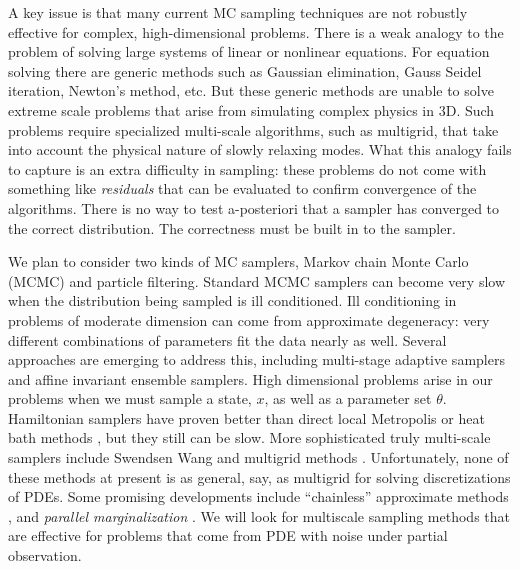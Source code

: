 \documentclass[11pt]{article}
\begin{document}
A key issue is that many current MC sampling techniques are not robustly effective for complex, 
high-dimensional problems. 
There is a weak analogy to the problem of solving large systems of linear or nonlinear equations.
For equation solving there are generic methods such as Gaussian elimination, Gauss Seidel iteration,
Newton's method, etc.
But these generic methods are unable to solve extreme scale problems that arise from simulating
complex physics in 3D.
Such problems require specialized multi-scale algorithms, such as multigrid, that take into account the
physical nature of slowly relaxing modes.
What this analogy fails to capture is an extra difficulty in sampling: these problems do not come with 
something like {\em residuals} that can be evaluated to confirm convergence of the algorithms.
There is no way to test a-posteriori that a sampler has converged to the correct distribution.
The correctness must be built in to the sampler.

We plan to consider two kinds of MC samplers, Markov chain Monte Carlo (MCMC) and particle filtering.
Standard MCMC samplers can become very slow when the distribution being
sampled is ill conditioned.
Ill conditioning in problems of moderate dimension can come from approximate degeneracy: very
different combinations of parameters fit the data nearly as well.
Several approaches are emerging to address this, including multi-stage adaptive samplers and
affine invariant ensemble samplers.
High dimensional problems arise in our problems when we must sample a state, $x$, as well as a
parameter set $\theta$.
Hamiltonian samplers have proven better than direct local Metropolis or heat bath methods \cite{Hanson2001}, but
they still can be slow.
More sophisticated truly multi-scale samplers include Swendsen Wang \cite{SwendsonWang1987}
and multigrid methods \cite{Goodman1989}.
Unfortunately, none of these methods at present is as general, say, as multigrid for
solving discretizations of PDEs.
Some promising developments include ``chainless'' approximate methods \cite{Chorin:2008}, and
{\em parallel marginalization} \cite{Weare2007}.
We will look for multiscale sampling methods that are effective for problems that come from PDE
with noise under partial observation.
\end{document}

